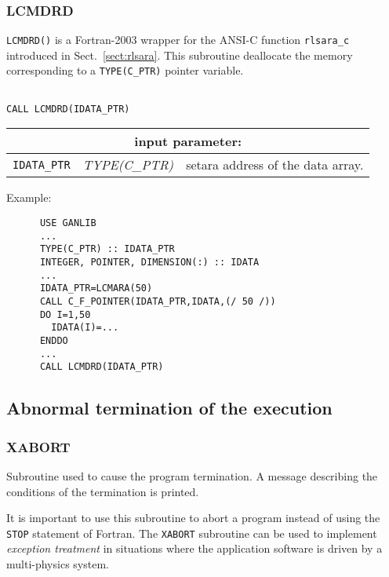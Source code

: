 \subsubsection{LCMDRD}\label{sect:LCMDRD}

{\tt LCMDRD()} is a Fortran-2003 wrapper for the ANSI-C function {\tt rlsara\_c} introduced in Sect.~\ref{sect:rlsara}. This subroutine
deallocate the memory corresponding to a {\tt TYPE(C\_PTR)} pointer variable.

\begin{verbatim}

CALL LCMDRD(IDATA_PTR)
\end{verbatim}

\noindent
\begin{tabular}{|p{1.5cm}|p{3cm}|p{10cm}|}
\hline
\multicolumn{3}{|c|}{\bf input parameter:} \\
\hline
{\tt IDATA\_PTR} & {\it TYPE(C\_PTR)} & setara address of the data array. \\
\hline
\end{tabular}

\vskip 0.4cm

\noindent Example:
\begin{verbatim}
      USE GANLIB
      ...
      TYPE(C_PTR) :: IDATA_PTR
      INTEGER, POINTER, DIMENSION(:) :: IDATA
      ...
      IDATA_PTR=LCMARA(50)
      CALL C_F_POINTER(IDATA_PTR,IDATA,(/ 50 /))
      DO I=1,50
        IDATA(I)=...
      ENDDO
      ...
      CALL LCMDRD(IDATA_PTR)
\end{verbatim}

\vskip 0.8cm

\subsection{Abnormal termination of the execution}

\subsubsection{XABORT}

Subroutine used to cause the program termination. A message describing the conditions of the
termination is printed.

\vskip 0.2cm

It is important to use this subroutine to abort a program instead of using the {\tt STOP}
statement of Fortran. The {\tt XABORT} subroutine can be used to implement {\sl exception
treatment} in situations where the application software is driven by a multi-physics system.


